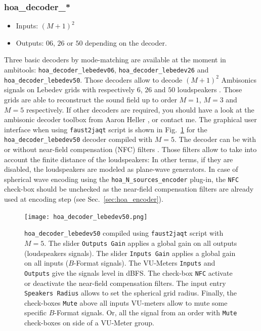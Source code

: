 \documentclass[10pt,a4paper]{article}
\begin{document}
\pagebreak
\subsubsection{hoa\_decoder\_*}
\label{sec:hoa_decoder}
\begin{itemize}
\item Inputs: $(M+1)^2$
\item Outputs: $06$, $26$ or $50$ depending on the decoder.
\end{itemize}

Three basic decoders by mode-matching \cite{daniel2000representation,poletti2005three} are available at the moment in ambitools: \lstinline'hoa_decoder_lebedev06', \lstinline'hoa_decoder_lebedev26' and
\lstinline'hoa_decoder_lebedev50'. Those decoders allow to decode $(M+1)^2$ Ambisonics signals on Lebedev grids with respectively $6$, $26$ and $50$ loudspeakers \cite{lebedev1975values,lecomte2015on}. Those grids are able to reconstruct the sound field up to order $M=1$, $M=3$ and $M=5$ respectively.
If other decoders are required, you should have a look at the ambisonic decoder toolbox from Aaron Heller \cite{heller2012toolkit}, or contact me. The graphical user interface when using \lstinline'faust2jaqt' script is shown in Fig.~\ref{fig:hoa_decoder_lebedev50} for the \lstinline'hoa_decoder_lebedev50' decoder compiled with $M=5$. The decoder can be with or without near-field compensation (NFC) filters \cite{daniel2003further,lecomte2015real}. Those filters allow to take into account the finite distance of the loudspeakers: In other terms, if they are disabled, the loudspeakers are modeled as plane-wave generators. In case of spherical wave encoding using the \lstinline'hoa_N_sources_encoder' plug-in, the \lstinline'NFC' check-box should be unchecked as the near-field compensation filters are already used at encoding step (see Sec.~\ref{sec:hoa_encoder}).
\begin{figure}[!ht]
\texttt{[image: hoa\_decoder\_lebedev50.png]}
\caption{\lstinline'hoa_decoder_lebedev50' compiled using \lstinline'faust2jaqt' script with $M=5$. The slider \lstinline'Outputs Gain' applies a global gain on all outputs (loudspeakers signals). The slider \lstinline'Inputs Gain' applies a global gain on all inputs ($B$-Format signals). The VU-Meters \lstinline'Inputs' and \lstinline'Outputs' give the signals level in dBFS. The check-box \lstinline'NFC' activate or deactivate the near-field compensation filters. The input entry \lstinline'Speakers Radius' allows to set the spherical grid radius. Finally, the check-boxes \lstinline'Mute' above all inputs VU-meters allow to mute some specific $B$-Format signals. Or, all the signal from an order with \lstinline'Mute' check-boxes on side of a VU-Meter group.}
\label{fig:hoa_decoder_lebedev50}
\end{figure}
\end{document}
